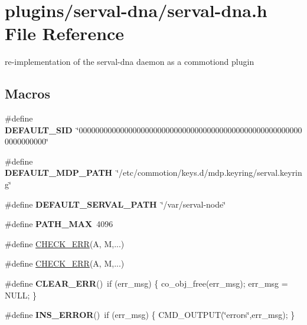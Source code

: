 \hypertarget{serval-dna_8h}{\section{plugins/serval-\/dna/serval-\/dna.h File Reference}
\label{serval-dna_8h}
}


re-\/implementation of the serval-\/dna daemon as a commotiond plugin  


\subsection*{Macros}
\begin{DoxyCompactItemize}
\item 
\hypertarget{serval-dna_8h_ade6bc30b860b7e0c016c9d1d4de78876}{\#define {\bfseries D\-E\-F\-A\-U\-L\-T\-\_\-\-S\-I\-D}~\char`\"{}0000000000000000000000000000000000000000000000000000000000000000\char`\"{}}\label{serval-dna_8h_ade6bc30b860b7e0c016c9d1d4de78876}

\item 
\hypertarget{serval-dna_8h_aa6eb102f7cb9b4ecc447f497f59aefcc}{\#define {\bfseries D\-E\-F\-A\-U\-L\-T\-\_\-\-M\-D\-P\-\_\-\-P\-A\-T\-H}~\char`\"{}/etc/commotion/keys.\-d/mdp.\-keyring/serval.\-keyring\char`\"{}}\label{serval-dna_8h_aa6eb102f7cb9b4ecc447f497f59aefcc}

\item 
\hypertarget{serval-dna_8h_ad6d73c9630ed82f7fe50ef5a025caa52}{\#define {\bfseries D\-E\-F\-A\-U\-L\-T\-\_\-\-S\-E\-R\-V\-A\-L\-\_\-\-P\-A\-T\-H}~\char`\"{}/var/serval-\/node\char`\"{}}\label{serval-dna_8h_ad6d73c9630ed82f7fe50ef5a025caa52}

\item 
\hypertarget{serval-dna_8h_ae688d728e1acdfe5988c7db45d6f0166}{\#define {\bfseries P\-A\-T\-H\-\_\-\-M\-A\-X}~4096}\label{serval-dna_8h_ae688d728e1acdfe5988c7db45d6f0166}

\item 
\#define \hyperlink{serval-dna_8h_a10ab198359509a611627a85d8321ac86}{C\-H\-E\-C\-K\-\_\-\-E\-R\-R}(A, M,...)
\item 
\#define \hyperlink{serval-dna_8h_a10ab198359509a611627a85d8321ac86}{C\-H\-E\-C\-K\-\_\-\-E\-R\-R}(A, M,...)
\item 
\hypertarget{serval-dna_8h_ad618463c254680a37e278c1e76aeb15d}{\#define {\bfseries C\-L\-E\-A\-R\-\_\-\-E\-R\-R}()~if (err\-\_\-msg) \{ co\-\_\-obj\-\_\-free(err\-\_\-msg); err\-\_\-msg = N\-U\-L\-L; \}}\label{serval-dna_8h_ad618463c254680a37e278c1e76aeb15d}

\item 
\hypertarget{serval-dna_8h_aeed42e449c7436fab8354659982dc443}{\#define {\bfseries I\-N\-S\-\_\-\-E\-R\-R\-O\-R}()~if (err\-\_\-msg) \{ C\-M\-D\-\_\-\-O\-U\-T\-P\-U\-T(\char`\"{}errors\char`\"{},err\-\_\-msg); \}}\label{serval-dna_8h_aeed42e449c7436fab8354659982dc443}

\end{DoxyCompactItemize}
